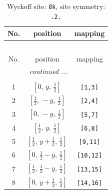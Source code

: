\documentclass[fleqn,8pt]{jsarticle}
\begin{document}
\begin{longtable}{ccc}
\caption{Wyckoff site: {\tt 8k}, site symmetry: {\tt .2.}}
 \\
 \hline \hline
No. & position & mapping \\ \hline \endfirsthead

\multicolumn{2}{l}{\tablename\ \thetable{}} \\
 \hline \hline
No. & position & mapping \\ \hline \endhead

 \hline \hline
\multicolumn{2}{r}{\footnotesize\it continued ...} \\ \endfoot

 \hline \hline
\multicolumn{2}{r}{} \\ \endlastfoot

1 & $\left[ 0,\, y,\, \frac{1}{2} \right]$ & {\tt [1,3]} \\ \hline
2 & $\left[ \frac{1}{2},\, - y,\, \frac{1}{2} \right]$ & {\tt [2,4]} \\ \hline
3 & $\left[ 0,\, - y,\, \frac{1}{2} \right]$ & {\tt [5,7]} \\ \hline
4 & $\left[ \frac{1}{2},\, y,\, \frac{1}{2} \right]$ & {\tt [6,8]} \\ \hline
5 & $\left[ \frac{1}{2},\, y + \frac{1}{2},\, \frac{1}{2} \right]$ & {\tt [9,11]} \\ \hline
6 & $\left[ 0,\, \frac{1}{2} - y,\, \frac{1}{2} \right]$ & {\tt [10,12]} \\ \hline
7 & $\left[ \frac{1}{2},\, \frac{1}{2} - y,\, \frac{1}{2} \right]$ & {\tt [13,15]} \\ \hline
8 & $\left[ 0,\, y + \frac{1}{2},\, \frac{1}{2} \right]$ & {\tt [14,16]} \\
\end{longtable}
\renewcommand{\arraystretch}{1.2}
\end{document}
